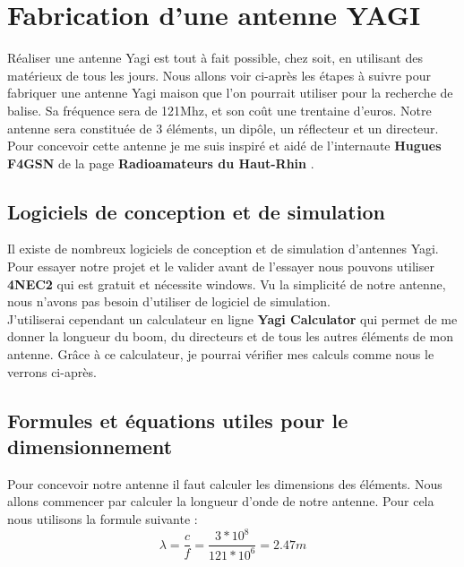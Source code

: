 \documentclass[12pt, a4paper]{article}
\begin{document}
\section{Fabrication d'une antenne YAGI}
Réaliser une antenne Yagi est tout à fait possible, chez 
soit, en utilisant des matérieux de tous les jours. 
Nous allons voir ci-après les étapes à suivre 
pour fabriquer une antenne Yagi maison que l'on 
pourrait utiliser pour la recherche de balise. Sa 
fréquence sera de 121Mhz, et son coût 
une trentaine d'euros. Notre antenne sera constituée
de 3 éléments, un dipôle, un réflecteur et un directeur.
Pour concevoir cette antenne je me suis inspiré et aidé
de l'internaute \textbf{Hugues F4GSN} de la page 
\textbf{Radioamateurs du Haut-Rhin} \cite{r5}.
\subsection{Logiciels de conception et de simulation}
Il existe de nombreux logiciels de conception et de
simulation d'antennes Yagi. Pour essayer notre 
projet et le valider avant de l'essayer nous pouvons 
utiliser \textbf{4NEC2} qui est gratuit et nécessite 
windows. Vu la simplicité de notre antenne, nous
n'avons pas besoin d'utiliser de logiciel de simulation.\\

J'utiliserai cependant un calculateur en ligne \textbf{Yagi Calculator}
qui permet de me donner la longueur du boom, du directeurs 
et de tous les autres éléments de mon antenne. Grâce 
à ce calculateur, je pourrai vérifier mes calculs comme 
nous le verrons ci-après.

\subsection{Formules et équations utiles pour le dimensionnement}
Pour concevoir notre antenne il faut calculer 
les dimensions des éléments. Nous allons 
commencer par calculer la longueur d'onde de notre
antenne. Pour cela nous utilisons la formule suivante :\\

\begin{equation}
    \lambda = \frac{c}{f}
    = \frac{3*10^8}{121*10^6}
    = 2.47m
\end{equation}
\end{document}
